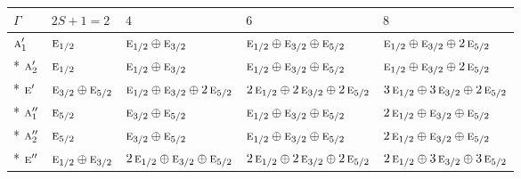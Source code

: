\documentclass[10pt,a4paper]{article}
\numberwithin{equation}{section}
\newcommand{\irr}[1]{\text{\normalfont\scshape #1}}
\begin{document}
{\small\setlength{\tabcolsep}{3pt}\begin{longtable}{@{}lllll@{}}\toprule
$\Gamma$ & $2S + 1 = 2$ & $4$ & $6$ & $8$\\\midrule\endhead
\bottomrule\endfoot\endlastfoot
$\irr{a}_{1}'$ & $\irr{e}_{1/2}$ & $\irr{e}_{1/2}\oplus \irr{e}_{3/2}$ & $\irr{e}_{1/2}\oplus \irr{e}_{3/2}\oplus \irr{e}_{5/2}$ & $\irr{e}_{1/2}\oplus \irr{e}_{3/2}\oplus 2\,\irr{e}_{5/2}$\\*
$\irr{a}_{2}'$ & $\irr{e}_{1/2}$ & $\irr{e}_{1/2}\oplus \irr{e}_{3/2}$ & $\irr{e}_{1/2}\oplus \irr{e}_{3/2}\oplus \irr{e}_{5/2}$ & $\irr{e}_{1/2}\oplus \irr{e}_{3/2}\oplus 2\,\irr{e}_{5/2}$\\*
$\irr{e}'$ & $\irr{e}_{3/2}\oplus \irr{e}_{5/2}$ & $\irr{e}_{1/2}\oplus \irr{e}_{3/2}\oplus 2\,\irr{e}_{5/2}$ & $2\,\irr{e}_{1/2}\oplus 2\,\irr{e}_{3/2}\oplus 2\,\irr{e}_{5/2}$ & $3\,\irr{e}_{1/2}\oplus 3\,\irr{e}_{3/2}\oplus 2\,\irr{e}_{5/2}$\\*
$\irr{a}_{1}''$ & $\irr{e}_{5/2}$ & $\irr{e}_{3/2}\oplus \irr{e}_{5/2}$ & $\irr{e}_{1/2}\oplus \irr{e}_{3/2}\oplus \irr{e}_{5/2}$ & $2\,\irr{e}_{1/2}\oplus \irr{e}_{3/2}\oplus \irr{e}_{5/2}$\\*
$\irr{a}_{2}''$ & $\irr{e}_{5/2}$ & $\irr{e}_{3/2}\oplus \irr{e}_{5/2}$ & $\irr{e}_{1/2}\oplus \irr{e}_{3/2}\oplus \irr{e}_{5/2}$ & $2\,\irr{e}_{1/2}\oplus \irr{e}_{3/2}\oplus \irr{e}_{5/2}$\\*
$\irr{e}''$ & $\irr{e}_{1/2}\oplus \irr{e}_{3/2}$ & $2\,\irr{e}_{1/2}\oplus \irr{e}_{3/2}\oplus \irr{e}_{5/2}$ & $2\,\irr{e}_{1/2}\oplus 2\,\irr{e}_{3/2}\oplus 2\,\irr{e}_{5/2}$ & $2\,\irr{e}_{1/2}\oplus 3\,\irr{e}_{3/2}\oplus 3\,\irr{e}_{5/2}$\\
\bottomrule\end{longtable}}
\end{document}
